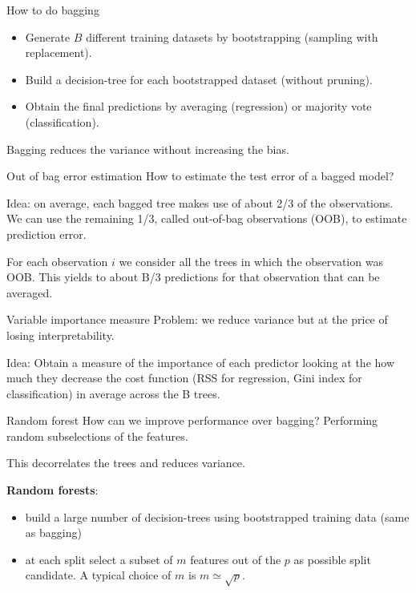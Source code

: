 \documentclass[notes]{beamer}          %
\begin{document}
\begin{frame}{How to do bagging}

\begin{itemize}
\item Generate $B$ different training datasets by bootstrapping (sampling with replacement).
\item Build a decision-tree for each bootstrapped dataset (without pruning).
\item Obtain the final predictions by averaging (regression) or majority vote (classification).
\end{itemize}

Bagging reduces the variance without increasing the bias.
\end{frame}

\begin{frame}{Out of bag error estimation}
How to estimate the test error of a bagged model?

\vspace{0.5cm}

Idea: on average, each bagged tree makes use of about 2/3 of the observations. We can use the remaining 1/3, called out-of-bag observations (OOB), to estimate prediction error.

\vspace{0.5cm}

For each observation $i$ we consider all the trees in which the observation was OOB. This yields to about B/3 predictions for that observation that can be averaged.
\end{frame}

\begin{frame}{Variable importance measure}
Problem: we reduce variance but at the price of losing interpretability. 

\vspace{0.5cm}

Idea: Obtain a measure of the importance of each predictor looking at the how much they decrease the cost function (RSS for regression, Gini index for classification) in average across the B trees. 

\end{frame}

\begin{frame}{Random forest}
How can we improve performance over bagging? Performing random subselections of the features. 

\vspace{0.5cm}

This decorrelates the trees and reduces variance.

\vspace{0.5cm}

\textbf{Random forests}:

\begin{itemize}
 \item build a large number of decision-trees using bootstrapped training data (same as bagging)
 \item at each split select a subset of $m$ features out of the $p$ as possible split candidate. A typical choice of $m$ is $m \simeq \sqrt p$.
\end{itemize}

\end{frame}
\end{document}

